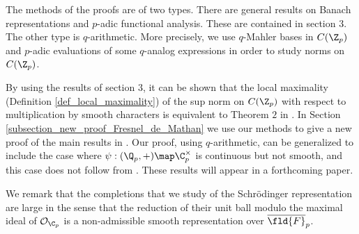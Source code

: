 The methods of the proofs are of two types.
There are general results on Banach representations and $p$-adic functional analysis.
These are contained in section $3$.
The other type is $q$-arithmetic.
More precisely, we use $q$-Mahler bases in $C(\Z_p)$ and $p$-adic evaluations of some $q$-analog expressions in order to study norms on $C(\Z_p)$.

By using the results of section $3$, it can be shown that the local maximality (Definition \ref{def_local_maximality}) of the sup norm on $C(\Z_p)$ with respect to multiplication by smooth characters is equivalent to Theorem $2$ in \cite{demathan}.
In Section \ref{subsection_new_proof_Fresnel_de_Mathan} we use our methods to give a new proof of the main results in \cite{demathan}.
Our proof, using $q$-arithmetic, can be generalized to include the case where $\psi:(\Q_p,+)\map \C_p^\times$ is continuous but not smooth, and this case does not follow from \cite{demathan}.
These results will appear in a forthcoming paper.

We remark that the completions that we study of the Schrödinger representation are large in the sense that the reduction of their unit ball modulo the maximal ideal of $\mathcal{O}_{\C_p}$ is a non-admissible smooth representation over $\overline{\fld{F}}_p$.